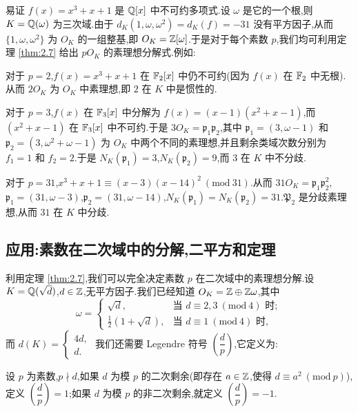 \begin{example}\label{ex:ch2-s2-2-1}
易证 $f(x)=x^3+x+1$ 是 $\mathbb{Q}[x]$ 中不可约多项式.设 $\omega$ 是它的一个根,则 $K=\mathbb{Q}(\omega)$ 为三次域.由于 $d_K(1,\omega,\omega^2)=d_K(f)=-31$ 没有平方因子,从而 $\{1,\omega,\omega^2\}$ 为 $O_K$ 的一组整基,即 $O_K=\mathbb{Z}[\omega]$.于是对于每个素数 $p$,我们均可利用定理 \ref{thm:2.7} 给出 $pO_K$ 的素理想分解式.例如:

对于 $p=2$,$f(x)=x^3+x+1$ 在 $\mathbb{F}_2[x]$ 中仍不可约(因为 $f(x)$ 在 $\mathbb{F}_2$ 中无根).从而 $2O_K$ 为 $O_K$ 中素理想,即 $2$ 在 $K$ 中是惯性的.

对于 $p=3$,$f(x)$ 在 $\mathbb{F}_3[x]$ 中分解为 $f(x)=(x-1)(x^2+x-1)$,而 $(x^2+x-1)$ 在 $\mathbb{F}_3[x]$ 中不可约.于是 $3O_K=\mathfrak{p}_1\mathfrak{p}_2$,其中 $\mathfrak{p}_1=(3,\omega-1)$ 和 $\mathfrak{p}_2=(3,\omega^2+\omega-1)$ 为 $O_K$ 中两个不同的素理想,并且剩余类域次数分别为 $f_1=1$ 和 $f_2=2$.于是 $N_K(\mathfrak{p}_1)=3$,$N_K(\mathfrak{p}_2)=9$,而 $3$ 在 $K$ 中不分歧.

对于 $p=31$,$x^3+x+1\equiv(x-3)(x-14)^2\ (\mathrm{mod}\ 31)$.从而 $31O_K=\mathfrak{p}_1\mathfrak{p}_2^2$,$\mathfrak{p}_1=(31,\omega-3)$,$\mathfrak{p}_2=(31,\omega-14)$,$N_K(\mathfrak{p}_1)=N_K(\mathfrak{p}_2)=31$.$\mathfrak{P}_2$ 是分歧素理想,从而 $31$ 在 $K$ 中分歧.
\end{example}

\subsection{应用:素数在二次域中的分解,二平方和定理}\label{sec:ch2-s2-3}

利用定理 \ref{thm:2.7},我们可以完全决定素数 $p$ 在二次域中的素理想分解.设 $K=\mathbb{Q}(\sqrt{d})$,$d\in\mathbb{Z}$,无平方因子.我们已经知道 $O_K=\mathbb{Z}\oplus\mathbb{Z}\omega$,其中
\[
  \omega=\begin{cases}
    \sqrt{d}, & \text{当 } d\equiv 2,3\ (\mathrm{mod}\ 4)\text{ 时};\\[2pt]
    \frac{1}{2}(1+\sqrt{d}), & \text{当 } d\equiv 1\ (\mathrm{mod}\ 4)\text{ 时},
  \end{cases}
\]
而 $d(K)=\begin{cases}4d,\\ d.\end{cases}$ 我们还需要 Legendre 符号 $\left(\dfrac{d}{p}\right)$,它定义为:

设 $p$ 为素数,$p\nmid d$,如果 $d$ 为模 $p$ 的二次剩余(即存在 $a\in\mathbb{Z}$,使得 $d\equiv a^2\ (\mathrm{mod}\ p)$),定义 $\left(\dfrac{d}{p}\right)=1$;如果 $d$ 为模 $p$ 的非二次剩余,就定义 $\left(\dfrac{d}{p}\right)=-1$.

